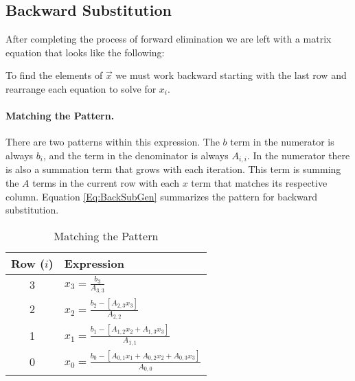 \documentclass{../../KDHnotes}
\begin{document}






\subsection{Backward Substitution}

After completing the process of forward elimination we are left with a matrix equation that looks like the following:



To find the elements of $\vec{x}$ we must work backward starting with the last row and rearrange each equation to solve for $x_i$.

\paragraph{Matching the Pattern.}
There are two patterns within this expression. The $b$ term in the numerator is always $b_i$, and the term in the denominator is always $A_{i,i}$.
In the numerator there is also a summation term that grows with each iteration. This term is summing the $A$ terms in the current row with each $x$ term that matches its respective column.
Equation \ref{Eq:BackSubGen} summarizes the pattern for backward substitution.

\begin{table}[h!]
\centering
\caption{Matching the Pattern}
\label{Tab:PatternMatch}
{\renewcommand{\arraystretch}{2}
\begin{tabular}{|c|l|}
\hline 
Row ($i$) & Expression \\ \hline
3 & $\displaystyle x_3 = \frac{b_3}{A_{3,3}}$ \\ \hline
2 & $\displaystyle x_2 = \frac{b_2 - [A_{2,3}x_3]}                      {A_{2,2}}$\\ \hline
1 & $\displaystyle x_1 = \frac{b_1 - [A_{1,2}x_2 + A_{1,3}x_3]} {A_{1,1}}$\\ \hline
0 & $\displaystyle x_0 = \frac{b_0 - [A_{0,1}x_1+A_{0,2}x_2+A_{0,3}x_3]} {A_{0,0}}$ \\
\hline
\end{tabular} 
}
\end{table}
\end{document}
